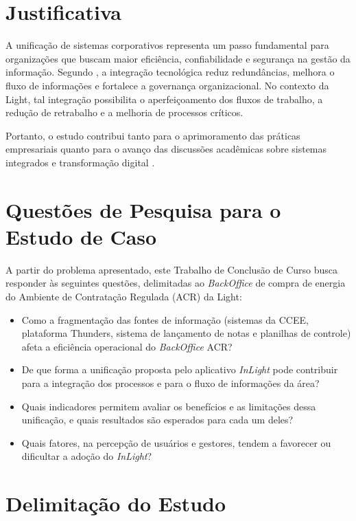 \section{Justificativa}

A unificação de sistemas corporativos representa um passo fundamental para organizações que buscam maior eficiência, confiabilidade e segurança na gestão da informação. Segundo \cite{rezende2017}, a integração tecnológica reduz redundâncias, melhora o fluxo de informações e fortalece a governança organizacional. No contexto da Light, tal integração possibilita o aperfeiçoamento dos fluxos de trabalho, a redução de retrabalho e a melhoria de processos críticos.

Portanto, o estudo contribui tanto para o aprimoramento das práticas empresariais quanto para o avanço das discussões acadêmicas sobre sistemas integrados e transformação digital \citep{davenport2018}.

\section{Questões de Pesquisa para o Estudo de Caso}

A partir do problema apresentado, este Trabalho de Conclusão de Curso busca responder às seguintes questões, delimitadas ao \textit{BackOffice} de compra de energia do Ambiente de Contratação Regulada (ACR) da Light:

\begin{itemize}
    \item[\textbf{QP1:}] Como a fragmentação das fontes de informação (sistemas da CCEE, plataforma Thunders, sistema de lançamento de notas e planilhas de controle) afeta a eficiência operacional do \textit{BackOffice} ACR?
    \item[\textbf{QP2:}] De que forma a unificação proposta pelo aplicativo \textit{InLight} pode contribuir para a integração dos processos e para o fluxo de informações da área?
    \item[\textbf{QP3:}] Quais indicadores permitem avaliar os benefícios e as limitações dessa unificação, e quais resultados são esperados para cada um deles?
    \item[\textbf{QP4:}] Quais fatores, na percepção de usuários e gestores, tendem a favorecer ou dificultar a adoção do \textit{InLight}?
\end{itemize}

\section{Delimitação do Estudo}

